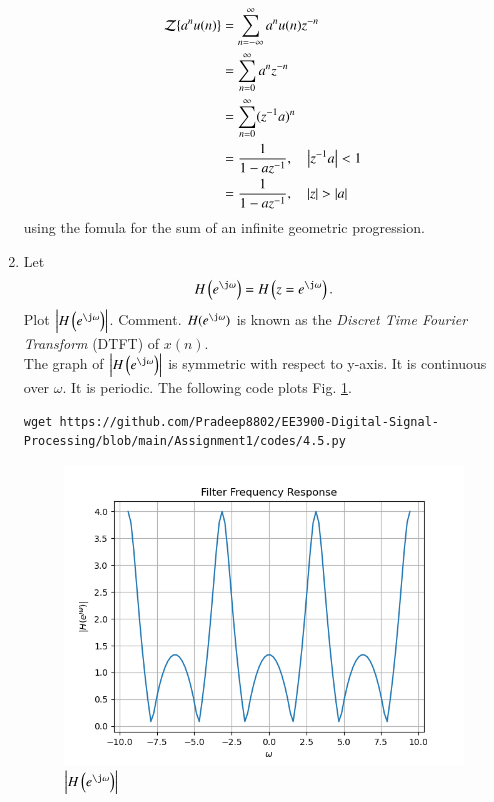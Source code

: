 \documentclass[journal,12pt,twocolumn]{IEEEtran}
\renewcommand\thesection{\arabic{section}}
\begin{document}
\begin{enumerate}[label=\thesection.\arabic*]
\begin{equation}
\end{equation}
\solution
\begin{align}
	{\mathcal {Z}}\{a^nu(n)\}&=\sum _{n=-\infty }^{\infty }a^nu(n)z^{-n}\\
	&=\sum _{n=0 }^{\infty }a^nz^{-n}\\
	&=\sum _{n=0 }^{\infty }(z^{-1}a)^{n}\\
	&=\frac{1}{1-az^{-1}}, \quad \left\vert z^{-1}a\right\vert < 1\\
	&=\frac{1}{1-az^{-1}}, \quad \left\vert z\right\vert > \left\vert a\right\vert 
\end{align}
using the fomula for the sum of an infinite geometric progression.
%
\item 
Let
\begin{equation}
H\brak{e^{\j \omega}} = H\brak{z = e^{\j \omega}}.
\end{equation}
Plot $\abs{H\brak{e^{\j \omega}}}$.  Comment.  $H(e^{\j \omega})$ is
known as the {\em Discret Time Fourier Transform} (DTFT) of $x(n)$.
\\
\solution The graph of $\abs{H\brak{e^{\j\omega}}}$ is symmetric with respect to y-axis. It is continuous over $\omega$. It is periodic. The following code plots Fig. \ref{fig:4.5}.
\begin{lstlisting}
wget https://github.com/Pradeep8802/EE3900-Digital-Signal-Processing/blob/main/Assignment1/codes/4.5.py
\end{lstlisting}
\begin{figure}[!ht]
\centering
\includegraphics[width=\columnwidth]{./figs/4.5}
\caption{$\abs{H\brak{e^{\j\omega}}}$}
\label{fig:4.5}
\end{figure}
\end{enumerate}
\end{document}
